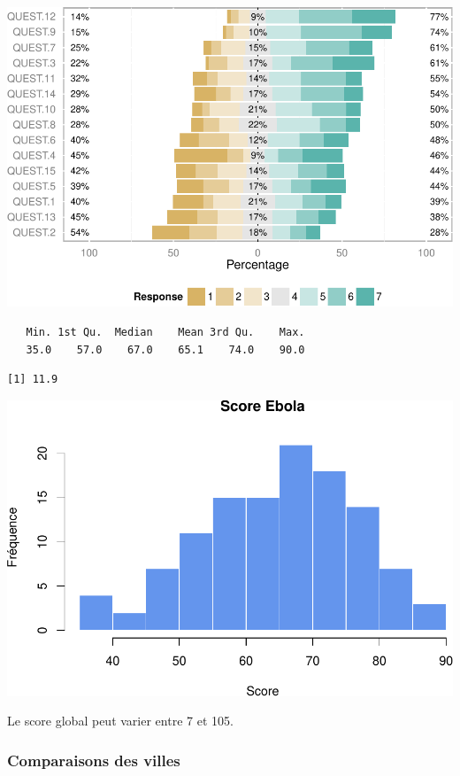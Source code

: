\documentclass[]{article}
\begin{document}
\includegraphics{analyse_files/figure-latex/unnamed-chunk-9-1.pdf}

\begin{verbatim}
   Min. 1st Qu.  Median    Mean 3rd Qu.    Max. 
   35.0    57.0    67.0    65.1    74.0    90.0 
\end{verbatim}

\begin{verbatim}
[1] 11.9
\end{verbatim}

\includegraphics{analyse_files/figure-latex/unnamed-chunk-9-2.pdf}

Le score global peut varier entre 7 et 105.

\subsubsection{Comparaisons des villes}\label{comparaisons-des-villes}
\end{document}
